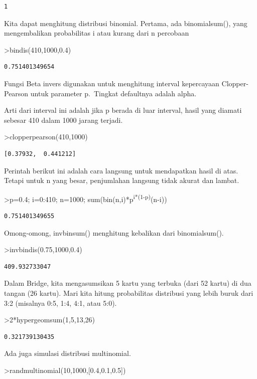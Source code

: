 \documentclass[
]{book}
\begin{document}
\begin{verbatim}
1
\end{verbatim}

Kita dapat menghitung distribusi binomial. Pertama, ada binomialsum(), yang mengembalikan probabilitas i atau kurang dari n percobaan

\textgreater bindis(410,1000,0.4)

\begin{verbatim}
0.751401349654
\end{verbatim}

Fungsi Beta invers digunakan untuk menghitung interval kepercayaan Clopper-Pearson untuk parameter p.~Tingkat defaultnya adalah alpha.

Arti dari interval ini adalah jika p berada di luar interval, hasil yang diamati sebesar 410 dalam 1000 jarang terjadi.

\textgreater clopperpearson(410,1000)

\begin{verbatim}
[0.37932,  0.441212]
\end{verbatim}

Perintah berikut ini adalah cara langsung untuk mendapatkan hasil di atas. Tetapi untuk n yang besar, penjumlahan langsung tidak akurat dan lambat.

\textgreater p=0.4; i=0:410; n=1000; sum(bin(n,i)*p\textsuperscript{i*(1-p)}(n-i))

\begin{verbatim}
0.751401349655
\end{verbatim}

Omong-omong, invbinsum() menghitung kebalikan dari binomialsum().

\textgreater invbindis(0.75,1000,0.4)

\begin{verbatim}
409.932733047
\end{verbatim}

Dalam Bridge, kita mengasumsikan 5 kartu yang terbuka (dari 52 kartu) di dua tangan (26 kartu). Mari kita hitung probabilitas distribusi yang lebih buruk dari 3:2 (misalnya 0:5, 1:4, 4:1, atau 5:0).

\textgreater2*hypergeomsum(1,5,13,26)

\begin{verbatim}
0.321739130435
\end{verbatim}

Ada juga simulasi distribusi multinomial.

\textgreater randmultinomial(10,1000,{[}0.4,0.1,0.5{]})
\end{document}
